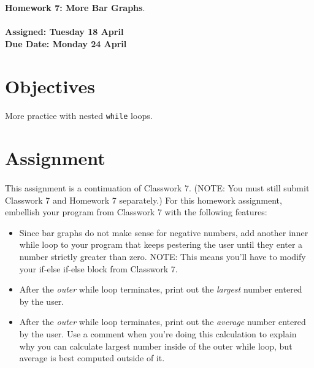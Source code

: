 \documentclass[letter,11pt]{article}
\begin{document}
\huge
\textbf{Homework 7: More Bar Graphs}.
\normalsize
\\ ~~ \\
\textbf{Assigned: Tuesday 18 April} \\
\textbf{Due Date: Monday 24 April}

\section*{Objectives}
\paragraph{}More practice with nested \texttt{while} loops.

\section*{Assignment}
\paragraph{}This assignment is a continuation of Classwork 7. (NOTE: You must still submit Classwork 7 and Homework 7 separately.) For this homework assignment, embellish your program from Classwork 7 with the following features:
\begin{itemize}
    \item Since bar graphs do not make sense for negative numbers, add another inner while loop to your program that keeps pestering the user until they enter a number strictly greater than zero. NOTE: This means you’ll have to modify your if-else if-else block from Classwork 7.
    \item After the \textit{outer} while loop terminates, print out the \textit{largest} number entered by the user.
    \item After the \textit{outer} while loop terminates, print out the \textit{average} number entered by the user. Use a comment when you're doing this calculation to explain why you can calculate largest number inside of the outer while loop, but average is best computed outside of it.
\end{itemize}
\end{document}
